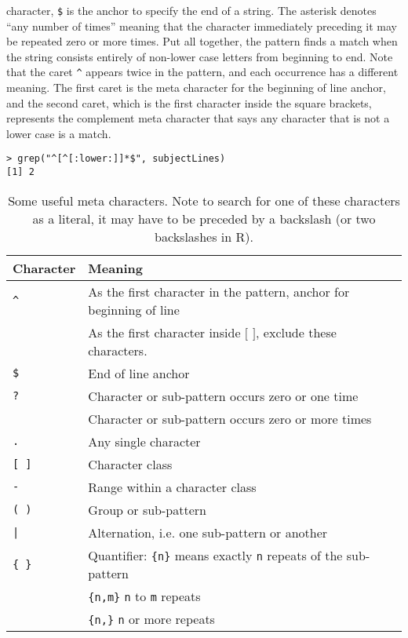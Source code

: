     character, \verb+$+ is the anchor to specify the end of a string.
    The asterisk denotes ``any number of times'' meaning that the
    character immediately preceding it may be repeated zero or more
    times.  Put all together, the pattern finds a match when the string
    consists entirely of non-lower case letters from beginning to end.
    Note that the caret \verb+^+ appears twice in the pattern, and each
    occurrence has a different meaning.  The first caret is the meta
    character for the beginning of line anchor, and the second caret,
    which is the first character inside the square brackets, represents
    the complement meta character that says any character that is not a
    lower case is a match.  
{\footnotesize{
\begin{verbatim}
> grep("^[^[:lower:]]*$", subjectLines)
[1] 2
\end{verbatim}
}}


\begin{table}
\begin{center}
\begin{tabular}{lp{4in}}
Character & Meaning \\
\hline
\verb+^+ & As the first character in the pattern, anchor for beginning of line\\
         & As the first character inside $[$ $]$, exclude these characters.\\
\verb+$+ & End of line anchor \\
\verb+?+ & Character or sub-pattern occurs zero or one time\\
\verb%+% & Character or sub-pattern occurs one or more times\\
\verb+*+ & Character or sub-pattern occurs zero or more times\\
\verb+.+ & Any single character\\
\verb+[ ]+ & Character class\\
\verb+-+  & Range within a character class\\
\verb+( )+ & Group or sub-pattern\\
\verb+|+ & Alternation, i.e. one sub-pattern or another\\
\verb+{ }+ & Quantifier: \verb+{n}+ means exactly \verb+n+ repeats of the sub-pattern\\
   &  \verb+{n,m}+ \verb+n+ to \verb+m+ repeats\\
   &   \verb+{n,}+ \verb+n+ or more repeats\\
\end{tabular}
\end{center}
\caption{Some useful meta characters. Note to search for one of these characters as a literal, it may have to be preceded by a backslash (or two backslashes in R).}\label{table:metaChars}
\end{table}

